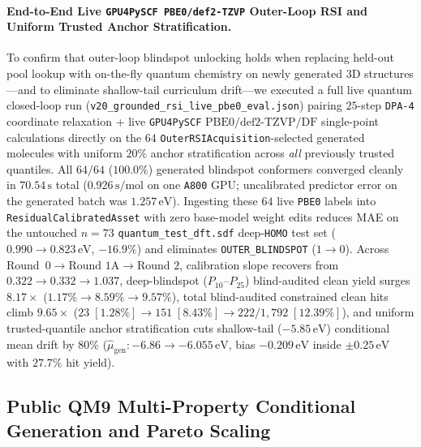 \documentclass[11pt,a4paper]{article}
\begin{document}
\paragraph{End-to-End Live \texttt{GPU4PySCF PBE0/def2-TZVP} Outer-Loop RSI and Uniform Trusted Anchor Stratification.}
To confirm that outer-loop blindspot unlocking holds when replacing held-out pool lookup with on-the-fly quantum chemistry on newly generated 3D structures---and to eliminate shallow-tail curriculum drift---we executed a full live quantum closed-loop run (\texttt{v20\_grounded\_rsi\_live\_pbe0\_eval.json}) pairing $25$-step \texttt{DPA-4} coordinate relaxation + live \texttt{GPU4PySCF} $\text{PBE0/def2-TZVP/DF}$ single-point calculations directly on the $64$ \texttt{OuterRSIAcquisition}-selected generated molecules with uniform $20\%$ anchor stratification across \emph{all} previously trusted quantiles. All $64/64$ ($100.0\%$) generated blindspot conformers converged cleanly in $70.54\,\text{s}$ total ($0.926\,\text{s/mol}$ on one \texttt{A800} GPU; uncalibrated predictor error on the generated batch was $1.257\,\text{eV}$). Ingesting these $64$ live \texttt{PBE0} labels into \texttt{ResidualCalibratedAsset} with zero base-model weight edits reduces MAE on the untouched $n=73$ \texttt{quantum\_test\_dft.sdf} deep-\texttt{HOMO} test set ($0.990 \to 0.823\,\text{eV}$, $-16.9\%$) and eliminates \texttt{OUTER\_BLINDSPOT} ($1 \to 0$). Across Round~$0 \to \text{Round } 1\text{A} \to \text{Round } 2$, calibration slope recovers from $0.322 \to 0.332 \to 1.037$, deep-blindspot ($P_{10}\text{--}P_{25}$) blind-audited clean yield surges $8.17\times$ ($1.17\% \to 8.59\% \to 9.57\%$), total blind-audited constrained clean hits climb $9.65\times$ ($23\;[1.28\%] \to 151\;[8.43\%] \to 222 / 1{,}792\;[12.39\%]$), and uniform trusted-quantile anchor stratification cuts shallow-tail ($-5.85\,\text{eV}$) conditional mean drift by $80\%$ ($\hat{\mu}_{\text{gen}}: -6.86 \to -6.055\,\text{eV}$, bias $-0.209\,\text{eV}$ inside $\pm 0.25\,\text{eV}$ with $27.7\%$ hit yield).

\subsection{Public QM9 Multi-Property Conditional Generation and Pareto Scaling}
\label{sec:exp_qm9}
\end{document}
